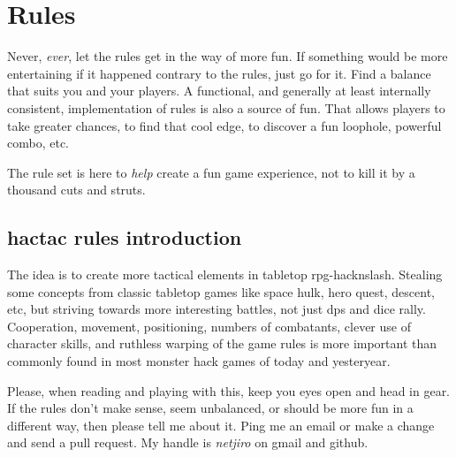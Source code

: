 

%
%


\cleardoublepage



\chapter*{Rules}

Never, \emph{ever}, let the rules get in the way of more fun. If something would be more entertaining if it happened contrary to the rules, just go for it. Find a balance that suits you and your players. A functional, and generally at least internally consistent, implementation of rules is also a source of fun. That allows players to take greater chances, to find that cool edge, to discover a fun loophole, powerful combo, etc.

The rule set is here to \emph{help} create a fun game experience, not to kill it by a thousand cuts and struts.


\section*{hactac rules introduction}

The idea is to create more tactical elements in tabletop rpg-hacknslash. Stealing some concepts from classic tabletop games like space hulk, hero quest, descent, etc, but striving towards more interesting battles, not just dps and dice rally.
Cooperation, movement, positioning, numbers of combatants, clever use of character skills, and ruthless warping of the game rules is more important than commonly found in most monster hack games of today and yesteryear.

Please, when reading and playing with this, keep you eyes open and head in gear. If the rules don't make sense, seem unbalanced, or should be more fun in a different way, then please tell me about it. Ping me an email or make a change and send a pull request. My handle is \emph{netjiro} on gmail and github.

